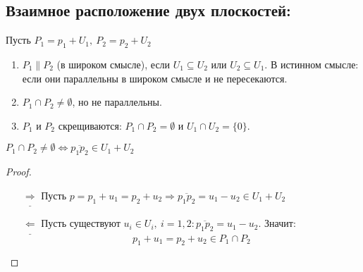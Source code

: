 \subsection*{Взаимное расположение двух плоскостей:}
Пусть $P_1=p_1+U_1,\ P_2=p_2+U_2$
\begin{enumerate}
    \item $P_1 \parallel P_2$ (в широком смысле), если $U_1\subseteq U_2$ или $U_2\subseteq U_1$. В истинном смысле: если они параллельны в широком смысле и не пересекаются. 
    \item $P_1 \cap P_2\ne \emptyset$, но не параллельны.
    \item $P_1$ и $P_2$ скрещиваются: $P_1\cap P_2=\emptyset$ и $U_1\cap U_2 =\{0\}$.
\end{enumerate}
\begin{subtheorem}
    $P_1\cap P_2\ne \emptyset \Longleftrightarrow \overline{p_1p_2}\in U_1+U_2$
\end{subtheorem} 
\begin{proof} \tab
    \begin{itemize}
        \item[$\underline{\Longrightarrow}$] Пусть $p=p_1+u_1=p_2+u_2 \Rightarrow \overline{p_1p_2}=u_1-u_2\in U_1+U_2$
        \item[$\underline{\Longleftarrow}$] Пусть существуют $u_i\in U_i,\ i=1,2: \overline{p_1p_2}=u_1-u_2$. 
        Значит:
        \[p_1+u_1=p_2+u_2\in P_1\cap P_2\]
    \end{itemize}
\end{proof}

